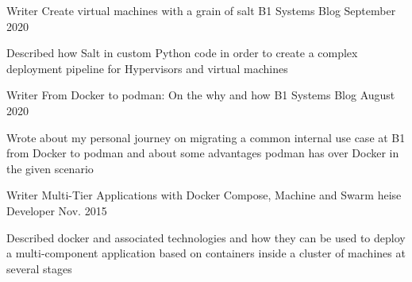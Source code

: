 {}


\begin{cventries}

  \cventry
    {Writer} %
    {Create virtual machines with a grain of salt} %
    {B1 Systems Blog} %
    {September 2020} %
    {
      \begin{cvitems} %
        \item {Described how Salt in custom Python code in order to create a complex deployment
          pipeline for Hypervisors and virtual machines}
      \end{cvitems}
    }
  \cventry
    {Writer} %
    {From Docker to podman: On the why and how} %
    {B1 Systems Blog} %
    {August 2020} %
    {
      \begin{cvitems} %
        \item {Wrote about my personal journey on migrating a common internal use case at B1 from
          Docker to podman and about some advantages podman has over Docker in the given scenario}
      \end{cvitems}
    }
  \cventry
    {Writer} %
    {Multi-Tier Applications with Docker Compose, Machine and Swarm} %
    {heise Developer} %
    {Nov. 2015} %
    {
      \begin{cvitems} %
        \item {Described docker and associated technologies and how they can be used to deploy a multi-component application based on containers inside a cluster of machines at several stages}
      \end{cvitems}
    }


\end{cventries}
